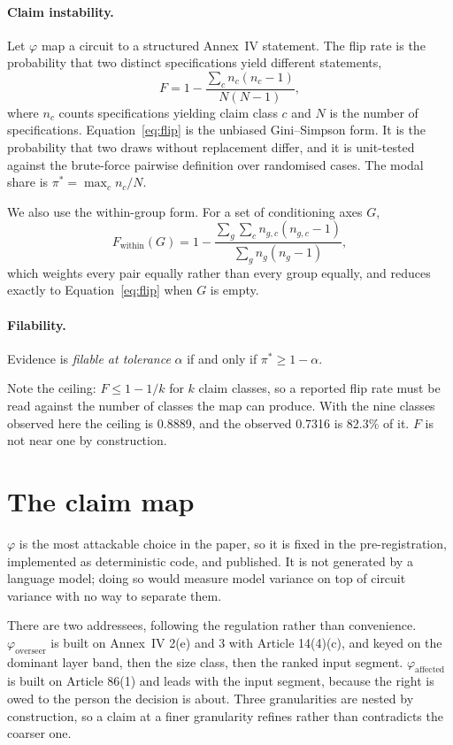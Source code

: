 \documentclass[11pt]{article}
\begin{document}
\paragraph{Claim instability.} Let $\varphi$ map a circuit to a structured
Annex~IV statement. The flip rate is the probability that two distinct
specifications yield different statements,
\begin{equation}
F = 1 - \frac{\sum_c n_c (n_c - 1)}{N(N-1)},
\label{eq:flip}
\end{equation}
where $n_c$ counts specifications yielding claim class $c$ and $N$ is the number
of specifications. Equation~\ref{eq:flip} is the unbiased Gini--Simpson form. It is
the probability that two draws without replacement differ, and it is unit-tested
against the brute-force pairwise definition over randomised cases. The modal share
is $\pi^{*} = \max_c n_c / N$.

We also use the within-group form. For a set of conditioning axes $G$,
\begin{equation}
F_{\text{within}}(G) = 1 - \frac{\sum_g \sum_c n_{g,c}(n_{g,c}-1)}{\sum_g n_g(n_g-1)},
\label{eq:within}
\end{equation}
which weights every pair equally rather than every group equally, and reduces
exactly to Equation~\ref{eq:flip} when $G$ is empty.

\paragraph{Filability.} Evidence is \emph{filable at tolerance} $\alpha$ if and
only if $\pi^{*} \geq 1 - \alpha$.

Note the ceiling: $F \leq 1 - 1/k$ for $k$ claim classes, so a reported flip rate
must be read against the number of classes the map can produce. With the nine
classes observed here the ceiling is 0.8889, and the observed 0.7316 is 82.3\% of
it. $F$ is not near one by construction.

\section{The claim map}

$\varphi$ is the most attackable choice in the paper, so it is fixed in the
pre-registration, implemented as deterministic code, and published. It is not
generated by a language model; doing so would measure model variance on top of
circuit variance with no way to separate them.

There are two addressees, following the regulation rather than convenience.
$\varphi_{\text{overseer}}$ is built on Annex~IV 2(e) and 3 with Article 14(4)(c),
and keyed on the dominant layer band, then the size class, then the ranked input
segment. $\varphi_{\text{affected}}$ is built on Article 86(1) and leads with the
input segment, because the right is owed to the person the decision is about.
Three granularities are nested by construction, so a claim at a finer granularity
refines rather than contradicts the coarser one.
\end{document}
